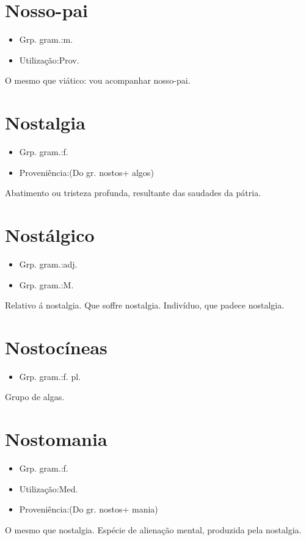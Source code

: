 \section{Nosso-pai}
\begin{itemize}
\item {Grp. gram.:m.}
\end{itemize}
\begin{itemize}
\item {Utilização:Prov.}
\end{itemize}
O mesmo que \textunderscore viático\textunderscore : \textunderscore vou acompanhar nosso-pai\textunderscore .
\section{Nostalgia}
\begin{itemize}
\item {Grp. gram.:f.}
\end{itemize}
\begin{itemize}
\item {Proveniência:(Do gr. \textunderscore nostos\textunderscore  + \textunderscore algos\textunderscore )}
\end{itemize}
Abatimento ou tristeza profunda, resultante das saudades da pátria.
\section{Nostálgico}
\begin{itemize}
\item {Grp. gram.:adj.}
\end{itemize}
\begin{itemize}
\item {Grp. gram.:M.}
\end{itemize}
Relativo á nostalgia.
Que soffre nostalgia.
Indivíduo, que padece nostalgia.
\section{Nostocíneas}
\begin{itemize}
\item {Grp. gram.:f. pl.}
\end{itemize}
Grupo de algas.
\section{Nostomania}
\begin{itemize}
\item {Grp. gram.:f.}
\end{itemize}
\begin{itemize}
\item {Utilização:Med.}
\end{itemize}
\begin{itemize}
\item {Proveniência:(Do gr. \textunderscore nostos\textunderscore  + \textunderscore mania\textunderscore )}
\end{itemize}
O mesmo que \textunderscore nostalgia\textunderscore .
Espécie de alienação mental, produzida pela nostalgia.
